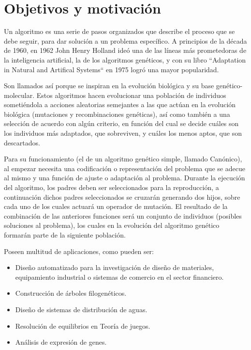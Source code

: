 \chapter{Objetivos y motivación}


\bigskip
Un algoritmo es una serie de pasos organizados que describe el proceso que se debe seguir, para dar solución a un problema específico. A principios de la década de 1960, en 1962 John Henry Holland ideó una de las líneas más prometedoras de la inteligencia artificial, la de los algoritmos genéticos, y con su libro ``Adaptation in Natural and Artifical Systems`` en 1975 logró una mayor popularidad. 

Son llamados así porque se inspiran en la evolución biológica y su base genético-molecular. Estos algoritmos hacen evolucionar una población de individuos sometiéndola a acciones aleatorias semejantes a las que actúan en la evolución biológica (mutaciones y recombinaciones genéticas), así como también a una selección de acuerdo con algún criterio, en función del cual se decide cuáles son los individuos más adaptados, que sobreviven, y cuáles los menos aptos, que son descartados.

\bigskip
Para su funcionamiento (el de un algoritmo genético simple, llamado Canónico), al empezar necesita una codificación o representación del problema que se adecue al mismo y una función de ajuste o adaptación al problema. Durante la ejecución del algoritmo, los padres deben ser seleccionados para la reproducción, a continuación dichos padres seleccionados se cruzarán generando dos hijos, sobre cada uno de los cuales actuará un operador de mutación. El resultado de la combinación de las anteriores funciones será un conjunto de individuos (posibles soluciones al problema), los cuales en la evolución del algoritmo genético formarán parte de la siguiente población.

\bigskip
Poseen multitud de aplicaciones, como pueden ser:

\begin{itemize}
	\item Diseño automatizado para la investigación de diseño de materiales, equipamiento industrial o sistemas de comercio en el sector financiero.
	\item Construcción de árboles filogenéticos.
	\item Diseño de sistemas de distribución de aguas.
	\item Resolución de equilibrios en Teoría de juegos.
	\item Análisis de expresión de genes.
\end{itemize}

